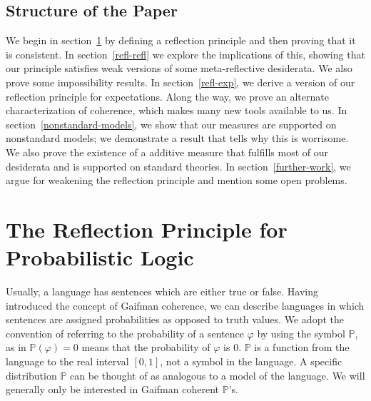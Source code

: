 \documentclass[12pt]{article}
\newcommand{\PP}{\mathbb{P}}
\newcommand{\vp}{\varphi}
\theoremstyle{plain}
\theoremstyle{definition}
\theoremstyle{remark}
\begin{document}
\subsection{Structure of the Paper} %
We begin in section~\ref{refl-cons} by defining a reflection principle and then proving that it is consistent. 
In section~\ref{refl-refl} we explore the implications of this, showing that our principle satisfies weak versions of some meta-reflective desiderata. 
We also prove some impossibility results. In section~\ref{refl-exp}, we derive a version of our reflection principle for expectations. 
Along the way, we prove an alternate characterization of coherence, which makes many new tools available to us. 
In section~\ref{nonstandard-models}, we show that our measures are supported on nonstandard models; we demonstrate a result that tells why this is worrisome. 
We also prove the existence of a  additive measure that fulfills most of our desiderata and is supported on standard theories. 
In section~\ref{further-work}, we argue for weakening the reflection principle and mention some open problems.

\section{The Reflection Principle for Probabilistic Logic}
\label{refl-cons}




Usually, a language has sentences which are either true or false. Having introduced the concept of Gaifman coherence, we can describe languages in which sentences are assigned probabilities as opposed to truth values. We adopt the convention of referring to the probability of a sentence $\vp$ by using the symbol $\PP$, as in $\PP(\vp)=0$ means that the probability of $\vp$ is $0$. $\PP$ is a function from the language to the real interval $[0,1]$, not a symbol in the language. A specific distribution $\PP$ can be thought of as analogous to a model of the language. We will generally only be interested in Gaifman coherent $\PP$'s.
\end{document}
